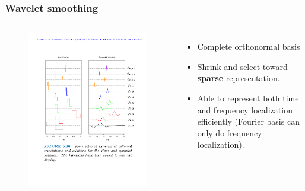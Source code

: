 \documentclass[aspectratio=169]{beamer}
\begin{document}
\begin{frame}
\frametitle{Wavelet smoothing}
\begin{columns}
\begin{figure}
    \centering
    \includegraphics[width=\textwidth]{figures/wavelets.pdf}
\end{figure}
    \begin{itemize}
        \item Complete orthonormal basis
        \item Shrink and select toward \textbf{sparse} representation.
        \item Able to represent both time and frequency localization efficiently (Fourier basis can only do frequency localization).
    \end{itemize}
\end{columns}
\end{frame} 
\end{document}
